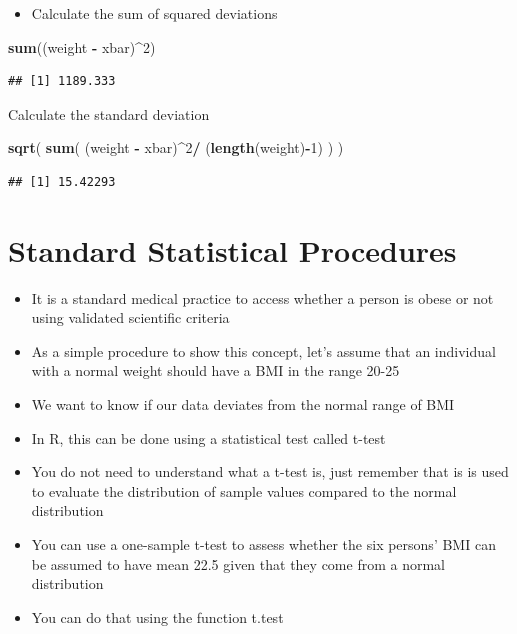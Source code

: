 \documentclass[
]{book}
\newenvironment{Shaded}{\begin{snugshade}}{\end{snugshade}}
\newcommand{\DecValTok}[1]{\textcolor[rgb]{0.00,0.00,0.81}{#1}}
\newcommand{\FunctionTok}[1]{\textcolor[rgb]{0.13,0.29,0.53}{\textbf{#1}}}
\newcommand{\NormalTok}[1]{#1}
\newcommand{\SpecialCharTok}[1]{\textcolor[rgb]{0.81,0.36,0.00}{\textbf{#1}}}
\providecommand{\tightlist}{%
  \setlength{\itemsep}{0pt}\setlength{\parskip}{0pt}}
\begin{document}
\begin{itemize}
\tightlist
\item
  Calculate the sum of squared deviations
\end{itemize}

\begin{Shaded}
\begin{Highlighting}[]
\FunctionTok{sum}\NormalTok{((weight }\SpecialCharTok{{-}}\NormalTok{ xbar)}\SpecialCharTok{\^{}}\DecValTok{2}\NormalTok{)}
\end{Highlighting}
\end{Shaded}

\begin{verbatim}
## [1] 1189.333
\end{verbatim}

Calculate the standard deviation

\begin{Shaded}
\begin{Highlighting}[]
\FunctionTok{sqrt}\NormalTok{(}
  \FunctionTok{sum}\NormalTok{(}
\NormalTok{    (weight }\SpecialCharTok{{-}}\NormalTok{ xbar)}\SpecialCharTok{\^{}}\DecValTok{2}\SpecialCharTok{/}
\NormalTok{      (}\FunctionTok{length}\NormalTok{(weight)}\SpecialCharTok{{-}}\DecValTok{1}\NormalTok{)}
\NormalTok{)}
\NormalTok{)}
\end{Highlighting}
\end{Shaded}

\begin{verbatim}
## [1] 15.42293
\end{verbatim}

\section{Standard Statistical Procedures}\label{standard-statistical-procedures}

\begin{itemize}
\item
  It is a standard medical practice to access whether a person is obese or not using validated scientific criteria
\item
  As a simple procedure to show this concept, let's assume that an individual with a normal weight should have a BMI in the range 20-25
\item
  We want to know if our data deviates from the normal range of BMI
\item
  In R, this can be done using a statistical test called t-test
\item
  You do not need to understand what a t-test is, just remember that is is used to evaluate the distribution of sample values compared to the normal distribution
\item
  You can use a one-sample t-test to assess whether the six persons' BMI can be assumed to have mean 22.5 given that they come from a normal distribution
\item
  You can do that using the function t.test
\end{itemize}
\end{document}
